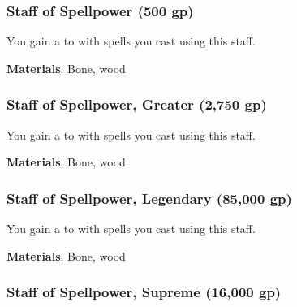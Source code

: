 \lowercase{\hypertarget{item:Staff of Spellpower}{}}\label{item:Staff of Spellpower}
\hypertarget{item:Staff of Spellpower}{\subsubsection{Staff of Spellpower\hfill{} (500 gp)}}

You gain a   to  with spells you cast using this staff.



\vspace{0.25em}
\textbf{Materials}: Bone, wood


\lowercase{\hypertarget{item:Staff of Spellpower, Greater}{}}\label{item:Staff of Spellpower, Greater}
\hypertarget{item:Staff of Spellpower, Greater}{\subsubsection{Staff of Spellpower, Greater\hfill{} (2,750 gp)}}

You gain a   to  with spells you cast using this staff.



\vspace{0.25em}
\textbf{Materials}: Bone, wood


\lowercase{\hypertarget{item:Staff of Spellpower, Legendary}{}}\label{item:Staff of Spellpower, Legendary}
\hypertarget{item:Staff of Spellpower, Legendary}{\subsubsection{Staff of Spellpower, Legendary\hfill{} (85,000 gp)}}

You gain a   to  with spells you cast using this staff.



\vspace{0.25em}
\textbf{Materials}: Bone, wood


\lowercase{\hypertarget{item:Staff of Spellpower, Supreme}{}}\label{item:Staff of Spellpower, Supreme}
\hypertarget{item:Staff of Spellpower, Supreme}{\subsubsection{Staff of Spellpower, Supreme\hfill{} (16,000 gp)}}

